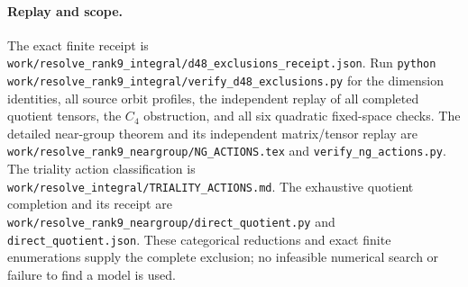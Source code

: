 \paragraph{Replay and scope.}
The exact finite receipt is
\nolinkurl{work/resolve_rank9_integral/d48_exclusions_receipt.json}.
Run \nolinkurl{python work/resolve_rank9_integral/verify_d48_exclusions.py}
for the dimension identities, all source orbit profiles, the independent
replay of all completed quotient tensors, the $C_4$ obstruction, and all six
quadratic fixed-space checks. The detailed near-group theorem and its
independent matrix/tensor replay are
\nolinkurl{work/resolve_rank9_neargroup/NG_ACTIONS.tex} and
\nolinkurl{verify_ng_actions.py}. The triality action classification is
\nolinkurl{work/resolve_integral/TRIALITY_ACTIONS.md}.
The exhaustive quotient completion and its receipt are
\nolinkurl{work/resolve_rank9_neargroup/direct_quotient.py} and
\nolinkurl{direct_quotient.json}. These categorical reductions and exact
finite enumerations supply the complete exclusion;
no infeasible numerical search or failure to find a model is used.
